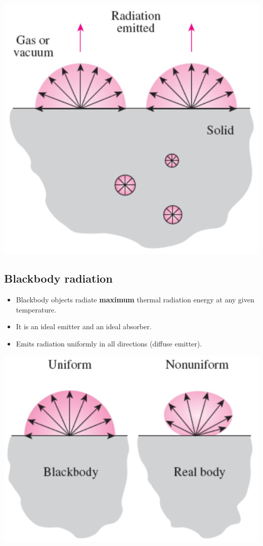 \documentclass[11pt]{article}
\begin{document}
\begin{center}
\includegraphics[width=.9\linewidth]{./images/thermal-radiation-diagram.png}
\end{center}

 \newpage
\subsection{Blackbody radiation}
\label{sec:orgfccb44c}
\begin{itemize}
\item Blackbody objects radiate \textbf{maximum} thermal radiation energy at any given temperature.
\item It is an ideal emitter and an ideal absorber.
\item Emits radiation uniformly in all directions (diffuse emitter).
\end{itemize}

\begin{center}
\includegraphics[width=.9\linewidth]{./images/blackbody-radiation-diagram.png}
\end{center}
\end{document}
